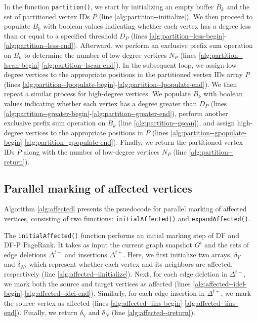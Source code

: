 In the function \texttt{partition()}, we start by initializing an empty buffer $B_k$ and the set of partitioned vertex IDs $P$ (line \ref{alg:partition--initialize}). We then proceed to populate $B_k$ with boolean values indicating whether each vertex has a degree less than or equal to a specified threshold $D_P$ (lines \ref{alg:partition--less-begin}-\ref{alg:partition--less-end}). Afterward, we perform an exclusive prefix sum operation on $B_k$ to determine the number of low-degree vertices $N_P$ (lines \ref{alg:partition--lscan-begin}-\ref{alg:partition--lscan-end}). In the subsequent loop, we assign low-degree vertices to the appropriate positions in the partitioned vertex IDs array $P$ (lines \ref{alg:partition--lpopulate-begin}-\ref{alg:partition--lpopulate-end}). We then repeat a similar process for high-degree vertices. We populate $B_k$ with boolean values indicating whether each vertex has a degree greater than $D_P$ (lines \ref{alg:partition--greater-begin}-\ref{alg:partition--greater-end}), perform another exclusive prefix sum operation on $B_k$ (line \ref{alg:partition--gscan}), and assign high-degree vertices to the appropriate positions in $P$ (lines \ref{alg:partition--gpopulate-begin}-\ref{alg:partition--gpopulate-end}). Finally, we return the partitioned vertex IDs $P$ along with the number of low-degree vertices $N_P$ (line \ref{alg:partition--return}).




\subsection{Parallel marking of affected vertices}
\label{sec:affected}

Algorithm \ref{alg:affected} presents the psuedocode for parallel marking of affected vertices, consisting of two functions: \texttt{initialAffected()} and \texttt{expandAffected()}.

The \texttt{initialAffected()} function performs an initial marking step of DF and DF-P PageRank. It takes as input the current graph snapshot $G^t$ and the sets of edge deletions $\Delta^{t-}$ and insertions $\Delta^{t+}$. Here, we first initialize two arrays, $\delta_V$ and $\delta_N$, which represent whether each vertex and its neighbors are affected, respectively (line \ref{alg:affected--iinitialize}). Next, for each edge deletion in $\Delta^{t-}$, we mark both the source and target vertices as affected (lines \ref{alg:affected--idel-begin}-\ref{alg:affected--idel-end}). Similarly, for each edge insertion in $\Delta^{t+}$, we mark the source vertex as affected (lines \ref{alg:affected--iins-begin}-\ref{alg:affected--iins-end}). Finally, we return $\delta_V$ and $\delta_N$ (line \ref{alg:affected--ireturn}).

